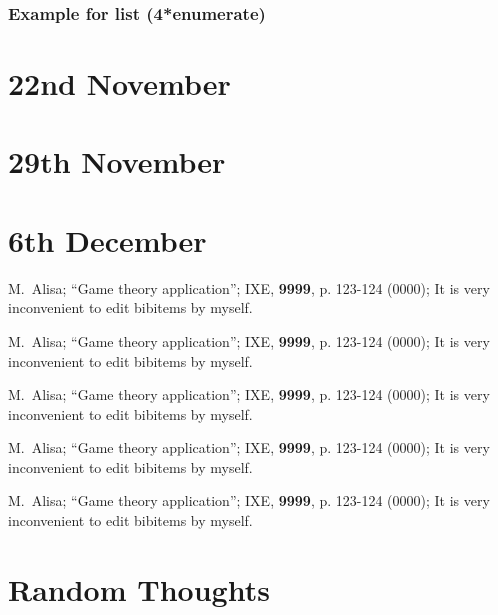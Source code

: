 \documentclass[a4paper, 11pt, twoside]{report}
\begin{document}
\subsection*{Example for list (4*enumerate)}

\chapter{22nd November}



\chapter{29th November}



\chapter{6th December}

\begin{thebibliography}{100}
 M.~Alisa;
        ``Game theory application'';
        IXE, \textbf{9999}, p. 123-124 (0000);
        It is very inconvenient to edit bibitems by myself.
        
 M.~Alisa;
``Game theory application'';
IXE, \textbf{9999}, p. 123-124 (0000);
It is very inconvenient to edit bibitems by myself.

 M.~Alisa;
        ``Game theory application'';
        IXE, \textbf{9999}, p. 123-124 (0000);
        It is very inconvenient to edit bibitems by myself.
        
 M.~Alisa;
``Game theory application'';
IXE, \textbf{9999}, p. 123-124 (0000);
It is very inconvenient to edit bibitems by myself.

 M.~Alisa;
        ``Game theory application'';
        IXE, \textbf{9999}, p. 123-124 (0000);
        It is very inconvenient to edit bibitems by myself.
\end{thebibliography}

\appendix
\chapter{Random Thoughts}

\printindex
\end{document}
